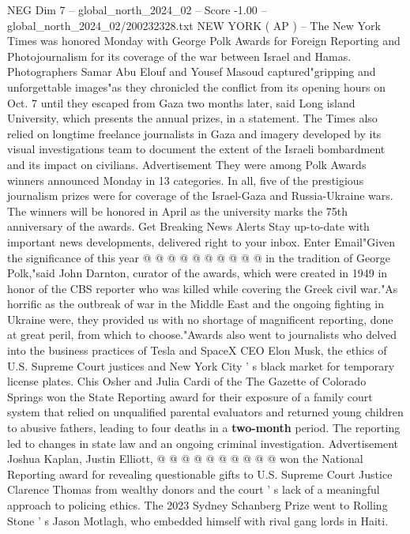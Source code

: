 \begin{textsample}{NEG Dim 7 – global\_north\_2024\_02 – Score -1.00 – global\_north\_2024\_02/200232328.txt}  \label{ex:f7_neg_426}
NEW YORK ( AP ) -- The New York Times was honored Monday with George Polk Awards for Foreign Reporting and Photojournalism for its coverage of the war between Israel and Hamas.
Photographers Samar Abu Elouf and Yousef Masoud captured"gripping and unforgettable images"as they chronicled the conflict from its opening hours on Oct. 7 until they escaped from Gaza two months later, said Long island University, which presents the annual prizes, in a statement.
The Times also relied on longtime freelance journalists in Gaza and imagery developed by its visual investigations team to document the extent of the Israeli bombardment and its impact on civilians.
Advertisement They were among Polk Awards winners announced Monday in 13 categories.
In all, five of the prestigious journalism prizes were for coverage of the Israel-Gaza and Russia-Ukraine wars.
The winners will be honored in April as the university marks the 75th anniversary of the awards.
Get Breaking News Alerts Stay up-to-date with important news developments, delivered right to your inbox.
Enter Email"Given the significance of this year @ @ @ @ @ @ @ @ @ @ in the tradition of George Polk,"said John Darnton, curator of the awards, which were created in 1949 in honor of the CBS reporter who was killed while covering the Greek civil war."As horrific as the outbreak of war in the Middle East and the ongoing fighting in Ukraine were, they provided us with no shortage of magnificent reporting, done at great peril, from which to choose."Awards also went to journalists who delved into the business practices of Tesla and SpaceX CEO Elon Musk, the ethics of U.S.
Supreme Court justices and New York City ' s black market for temporary license plates.
Chis Osher and Julia Cardi of the The Gazette of Colorado Springs won the State Reporting award for their exposure of a family court system that relied on unqualified parental evaluators and returned young children to abusive fathers, leading to four deaths in a \textbf{two-month} period.
The reporting led to changes in state law and an ongoing criminal investigation.
Advertisement Joshua Kaplan, Justin Elliott, @ @ @ @ @ @ @ @ @ @ won the National Reporting award for revealing questionable gifts to U.S.
Supreme Court Justice Clarence Thomas from wealthy donors and the court ' s lack of a meaningful approach to policing ethics.
The 2023 Sydney Schanberg Prize went to Rolling Stone ' s Jason Motlagh, who embedded himself with rival gang lords in Haiti.

\end{textsample}
